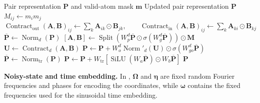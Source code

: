 \begin{algorithm}[H]
\caption{Pairmixer block}
\label{alg:pairmixer-block}
\begin{algorithmic}[1]
\Require Pair representation $\mathbf P$ and valid-atom mask $\mathbf m$
\Ensure Updated pair representation $\mathbf P$
\State $M_{ij}\gets m_i m_j$
\Statex $\displaystyle
\operatorname{Contract}_{\mathrm{out}}(\mathbf A,\mathbf B)_{ij}
\gets\sum_k\mathbf A_{ik}\odot\mathbf B_{jk},\qquad
\operatorname{Contract}_{\mathrm{in}}(\mathbf A,\mathbf B)_{ij}
\gets\sum_k\mathbf A_{ki}\odot\mathbf B_{kj}$
    \State $\overline{\mathbf P}\gets\operatorname{Norm}_{d}(\mathbf P)$
    \Statex $\displaystyle
    [\mathbf A,\mathbf B]\gets\operatorname{Split}\!\left(
    W_p^{d}\overline{\mathbf P}
    \odot\sigma(W_g^{d}\overline{\mathbf P})\right)\odot\mathbf M$
    \State $\mathbf U\gets\operatorname{Contract}_{d}(\mathbf A,\mathbf B)$
    \Statex $\displaystyle
    \mathbf P\gets\mathbf P+
    W_o^{d}\operatorname{Norm}'_{d}(\mathbf U)
    \odot\sigma(W_{go}^{d}\overline{\mathbf P})$
\EndFor
\Statex
{}
\State $\overline{\mathbf P}\gets\operatorname{Norm}_{\mathrm{tr}}(\mathbf P)$
\Statex $\displaystyle
\mathbf P\gets\mathbf P+W_{\mathrm{tr}}\!\left[
\operatorname{SiLU}(W_a\overline{\mathbf P})
\odot W_b\overline{\mathbf P}\right]$
\State \Return $\mathbf P$
\end{algorithmic}
\end{algorithm}

\textbf{Noisy-state and time embedding.} In , $\boldsymbol\Omega$ and $\boldsymbol\eta$ are fixed random Fourier frequencies and phases for encoding the coordinates, while $\boldsymbol\omega$ contains the fixed frequencies used for the sinusoidal time embedding.

